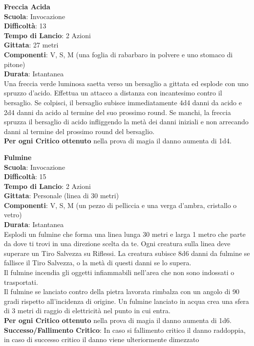\begin{multicols}{2}
\medskip\textbf{Freccia Acida}\\
\textbf{Scuola}: Invocazione\\
\textbf{Difficoltà}: 13\\
\textbf{Tempo di Lancio}: 2 Azioni\\
\textbf{Gittata}: 27 metri\\
\textbf{Componenti}: V, S, M (una foglia di rabarbaro in polvere e uno stomaco di pitone)\\
\textbf{Durata}: Istantanea\\
Una freccia verde luminosa saetta verso un bersaglio a gittata ed esplode con uno spruzzo d'acido. Effettua un attacco a distanza con incantesimo contro il bersaglio. Se colpisci, il bersaglio subisce immediatamente 4d4 danni da acido e 2d4 danni da acido al termine del suo prossimo round. Se manchi, la freccia spruzza il bersaglio di acido infliggendo la metà dei danni iniziali e non arrecando danni al termine del prossimo round del bersaglio.\\
\textbf{Per ogni Critico ottenuto} nella prova di magia il danno aumenta di 1d4.

\medskip\textbf{Fulmine}\\
\textbf{Scuola}: Invocazione\\
\textbf{Difficoltà}: 15\\
\textbf{Tempo di Lancio}: 2 Azioni\\
\textbf{Gittata}: Personale (linea di 30 metri)\\
\textbf{Componenti}: V, S, M (un pezzo di pelliccia e una verga d'ambra, cristallo o vetro)\\
\textbf{Durata}: Istantanea\\
Esplodi un fulmine che forma una linea lunga 30 metri e larga 1 metro che parte da dove ti trovi in una direzione scelta da te. Ogni creatura sulla linea deve superare un Tiro Salvezza su Riflessi. La creatura subisce 8d6 danni da fulmine se fallisce il Tiro Salvezza, o la metà di questi danni se lo supera.\\
Il fulmine incendia gli oggetti infiammabili nell'area che non sono indossati o trasportati.\\
Il fulmine se lanciato contro della pietra lavorata rimbalza con un angolo di 90 gradi rispetto all'incidenza di origine. Un fulmine lanciato in acqua crea una sfera di 3 metri di raggio di elettricità nel punto in cui entra.\\
\textbf{Per ogni Critico ottenuto} nella prova di magia il danno aumenta di 1d6.\\
\textbf{Successo/Fallimento Critico}: In caso si fallimento critico il danno raddoppia, in caso di successo critico il danno viene ulteriormente dimezzato


\end{multicols}
